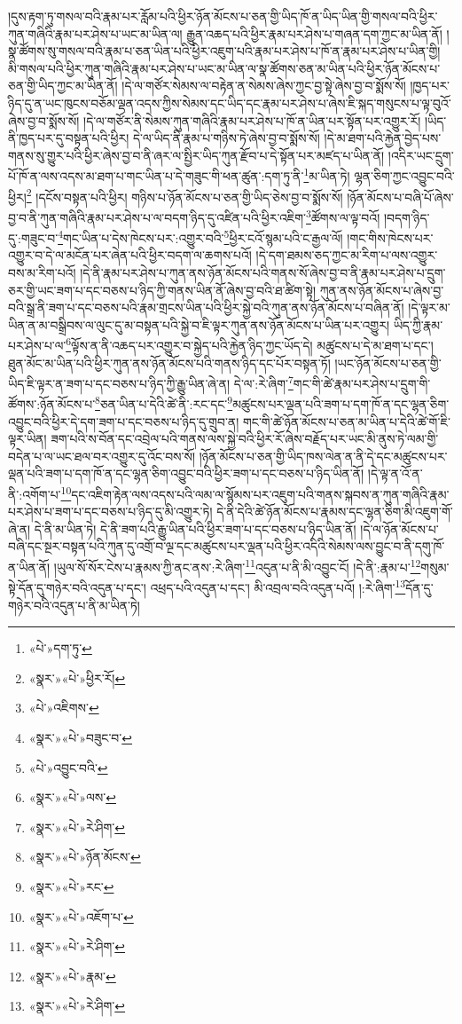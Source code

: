 །དུས་རྟག་ཏུ་གསལ་བའི་རྣམ་པར་རློམ་པའི་ཕྱིར་ཉོན་མོངས་པ་ཅན་གྱི་ཡིད་ཁོ་ན་ཡིད་ཡིན་གྱི་གསལ་བའི་ཕྱིར་ཀུན་གཞིའི་རྣམ་པར་ཤེས་པ་ཡང་མ་ཡིན་ལ། རྒྱུན་འཆད་པའི་ཕྱིར་རྣམ་པར་ཤེས་པ་གཞན་དག་ཀྱང་མ་ཡིན་ནོ། །སྣ་ཚོགས་སུ་གསལ་བའི་རྣམ་པ་ཅན་ཡིན་པའི་ཕྱིར་འཇུག་པའི་རྣམ་པར་ཤེས་པ་ཁོ་ན་རྣམ་པར་ཤེས་པ་ཡིན་གྱི། མི་གསལ་པའི་ཕྱིར་ཀུན་གཞིའི་རྣམ་པར་ཤེས་པ་ཡང་མ་ཡིན་ལ་སྣ་ཚོགས་ཅན་མ་ཡིན་པའི་ཕྱིར་ཉོན་མོངས་པ་ཅན་གྱི་ཡིད་ཀྱང་མ་ཡིན་ནོ། །དེ་ལ་གཙོར་སེམས་ལ་བརྟེན་ན་སེམས་ཞེས་ཀྱང་བྱ་སྟེ་ཞེས་བྱ་བ་སྨོས་སོ། །ཁྱད་པར་ཉིད་དུ་ན་ཡང་ཁུངས་བཅོམ་ལྡན་འདས་ཀྱིས་སེམས་དང་ཡིད་དང་རྣམ་པར་ཤེས་པ་ཞེས་ཇི་སྐད་གསུངས་པ་ལྟ་བུའོ་ཞེས་བྱ་བ་སྨོས་སོ། །དེ་ལ་གཙོར་ནི་སེམས་ཀུན་གཞིའི་རྣམ་པར་ཤེས་པ་ཁོ་ན་ཡིན་པར་སྟོན་པར་འགྱུར་རོ། །ཡིད་ནི་ཁྱད་པར་དུ་བསྟན་པའི་ཕྱིར། དེ་ལ་ཡིད་ནི་རྣམ་པ་གཉིས་ཏེ་ཞེས་བྱ་བ་སྨོས་སོ། །དེ་མ་ཐག་པའི་རྐྱེན་བྱེད་པས་གནས་སུ་གྱུར་པའི་ཕྱིར་ཞེས་བྱ་བ་ནི་ཞར་ལ་སྤྱིར་ཡིད་ཀུན་རྫོབ་པ་དེ་སྟོན་པར་མཛད་པ་ཡིན་ནོ། །འདིར་ཡང་དྲུག་པོ་ཁོ་ན་ལས་འདས་མ་ཐག་པ་གང་ཡིན་པ་དེ་གཟུང་གི་ཕན་ཚུན་:དག་ཏུ་ནི་\footnote{«པེ་»དག་ཏུ་}མ་ཡིན་ཏེ། ལྷན་ཅིག་ཀྱང་འབྱུང་བའི་ཕྱིར།\footnote{«སྣར་»«པེ་»ཕྱིར་རོ།} །དངོས་བསྟན་པའི་ཕྱིར། གཉིས་པ་ཉོན་མོངས་པ་ཅན་གྱི་ཡིད་ཅེས་བྱ་བ་སྨོས་སོ། །ཉོན་མོངས་པ་བཞི་པོ་ཞེས་བྱ་བ་ནི་ཀུན་གཞིའི་རྣམ་པར་ཤེས་པ་ལ་བདག་ཉིད་དུ་འཛིན་པའི་ཕྱིར་འཇིག་\footnote{«པེ་»འཇིགས་}ཚོགས་ལ་ལྟ་བའོ། །བདག་ཉིད་དུ་:གཟུང་བ་\footnote{«སྣར་»«པེ་»བཟུང་བ་}གང་ཡིན་པ་དེས་ཁེངས་པར་:འགྱུར་བའི་\footnote{«པེ་»འབྱུང་བའི་}ཕྱིར་ངའོ་སྙམ་པའི་ང་རྒྱལ་ལོ། །གང་གིས་ཁེངས་པར་འགྱུར་བ་དེ་ལ་མངོན་པར་ཞེན་པའི་ཕྱིར་བདག་ལ་ཆགས་པའོ། །དེ་དག་ཐམས་ཅད་ཀྱང་མ་རིག་པ་ལས་འགྱུར་བས་མ་རིག་པའོ། །དེ་ནི་རྣམ་པར་ཤེས་པ་ཀུན་ནས་ཉོན་མོངས་པའི་གནས་སོ་ཞེས་བྱ་བ་ནི་རྣམ་པར་ཤེས་པ་དྲུག་ཅར་གྱི་ཡང་ཟག་པ་དང་བཅས་པ་ཉིད་ཀྱི་གནས་ཡིན་ནོ་ཞེས་བྱ་བའི་ཐ་ཚིག་སྟེ། ཀུན་ནས་ཉོན་མོངས་པ་ཞེས་བྱ་བའི་སྒྲ་ནི་ཟག་པ་དང་བཅས་པའི་རྣམ་གྲངས་ཡིན་པའི་ཕྱིར་སྐྱེ་བའི་ཀུན་ནས་ཉོན་མོངས་པ་བཞིན་ནོ། །དེ་ལྟར་མ་ཡིན་ན་མ་བསྒྲིབས་ལ་ལུང་དུ་མ་བསྟན་པའི་སྐྱེ་བ་ཇི་ལྟར་ཀུན་ནས་ཉོན་མོངས་པ་ཡིན་པར་འགྱུར། ཡིད་ཀྱི་རྣམ་པར་ཤེས་པ་ལ་\footnote{«སྣར་»«པེ་»ལས་}ལྟོས་ན་ནི་འཆད་པར་འགྱུར་བ་སྐྱེད་པའི་རྐྱེན་ཉིད་ཀྱང་ཡོད་དེ། མཚུངས་པ་དེ་མ་ཐག་པ་དང་། ཐུན་མོང་མ་ཡིན་པའི་ཕྱིར་ཀུན་ནས་ཉོན་མོངས་པའི་གནས་ཉིད་དང་པོར་བསྟན་ཏོ། །ཡང་ཉོན་མོངས་པ་ཅན་གྱི་ཡིད་ཇི་ལྟར་ན་ཟག་པ་དང་བཅས་པ་ཉིད་ཀྱི་རྒྱུ་ཡིན་ཞེ་ན། དེ་ལ་:རེ་ཞིག་\footnote{«སྣར་»«པེ་»རེ་ཤིག་}གང་གི་ཚེ་རྣམ་པར་ཤེས་པ་དྲུག་གི་ཚོགས་:ཉོན་མོངས་པ་\footnote{«སྣར་»«པེ་»ཉོན་མོངས་}ཅན་ཡིན་པ་དེའི་ཚེ་ནི་:རང་དང་\footnote{«སྣར་»«པེ་»རང་}མཚུངས་པར་ལྡན་པའི་ཟག་པ་དག་ཁོ་ན་དང་ལྷན་ཅིག་འབྱུང་བའི་ཕྱིར་དེ་དག་ཟག་པ་དང་བཅས་པ་ཉིད་དུ་གྲུབ་ན། གང་གི་ཚེ་ཉོན་མོངས་པ་ཅན་མ་ཡིན་པ་དེའི་ཚེ་གོ་ཇི་ལྟར་ཡིན། ཟག་པའི་ས་བོན་དང་འབྲེལ་པའི་གནས་ལས་སྐྱེ་བའི་ཕྱིར་རོ་ཞེས་བརྗོད་པར་ཡང་མི་ནུས་ཏེ་ལམ་གྱི་བདེན་པ་ལ་ཡང་ཐལ་བར་འགྱུར་དུ་འོང་བས་སོ། །ཉོན་མོངས་པ་ཅན་གྱི་ཡིད་ཁས་ལེན་ན་ནི་དེ་དང་མཚུངས་པར་ལྡན་པའི་ཟག་པ་དག་ཁོ་ན་དང་ལྷན་ཅིག་འབྱུང་བའི་ཕྱིར་ཟག་པ་དང་བཅས་པ་ཉིད་ཡིན་ནོ། །དེ་ལྟ་ན་འོ་ན་ནི་:འགོག་པ་\footnote{«སྣར་»«པེ་»འཇོག་པ་}དང་འཇིག་རྟེན་ལས་འདས་པའི་ལམ་ལ་སྙོམས་པར་འཇུག་པའི་གནས་སྐབས་ན་ཀུན་གཞིའི་རྣམ་པར་ཤེས་པ་ཟག་པ་དང་བཅས་པ་ཉིད་དུ་མི་འགྱུར་ཏེ། དེ་ནི་དེའི་ཚེ་ཉོན་མོངས་པ་རྣམས་དང་ལྷན་ཅིག་མི་འཇུག་གོ་ཞེ་ན། དེ་ནི་མ་ཡིན་ཏེ། དེ་ནི་ཟག་པའི་རྒྱུ་ཡིན་པའི་ཕྱིར་ཟག་པ་དང་བཅས་པ་ཉིད་ཡིན་ནོ། །དེ་ལ་ཉོན་མོངས་པ་བཞི་དང་སྔར་བསྟན་པའི་ཀུན་དུ་འགྲོ་བ་ལྔ་དང་མཚུངས་པར་ལྡན་པའི་ཕྱིར་འདིའི་སེམས་ལས་བྱུང་བ་ནི་དགུ་ཁོ་ན་ཡིན་ནོ། །ཡུལ་སོ་སོར་ངེས་པ་རྣམས་ཀྱི་ནང་ནས་:རེ་ཞིག་\footnote{«སྣར་»«པེ་»རེ་ཤིག་}འདུན་པ་ནི་མི་འབྱུང་ངོ། །དེ་ནི་:རྣམ་པ་\footnote{«སྣར་»«པེ་»རྣམ་}གསུམ་སྟེ་དོན་དུ་གཉེར་བའི་འདུན་པ་དང་། འཕྲད་པའི་འདུན་པ་དང་། མི་འབྲལ་བའི་འདུན་པའོ། །:རེ་ཞིག་\footnote{«སྣར་»«པེ་»རེ་ཤིག་}དོན་དུ་གཉེར་བའི་འདུན་པ་ནི་མ་ཡིན་ཏེ། 